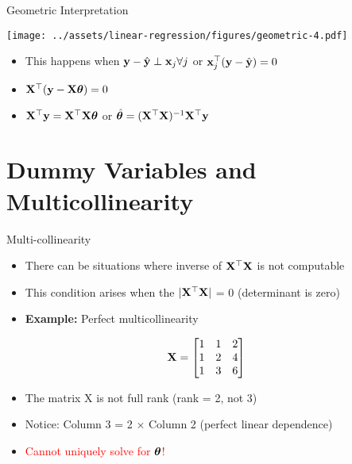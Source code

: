 \documentclass{beamer}
\begin{document}
\begin{frame}{Geometric Interpretation}	

    \texttt{[image: ../assets/linear-regression/figures/geometric-4.pdf]}

    


\begin{itemize}[<+->]
\item This happens when $\mathbf{y}-\hat{\mathbf{y}}\perp \mathbf{x}_j \forall j$ or $\mathbf{x}_j^\top(\mathbf{y}-\hat{\mathbf{y}})=0$
\item $\mathbf{X}^\top(\mathbf{y}-\mathbf{X}\boldsymbol{\theta})=0$
\item $\mathbf{X}^\top\mathbf{y} = \mathbf{X}^\top\mathbf{X}\boldsymbol{\theta}$ or $\hat{\boldsymbol{\theta}} =(\mathbf{X}^\top\mathbf{X})^{-1}\mathbf{X}^\top\mathbf{y}$ 
\end{itemize}

\end{frame}




\section{Dummy Variables and Multicollinearity}
\begin{frame}{Multi-collinearity}
\begin{itemize}[<+->]
    \item There can be situations where inverse of $\mathbf{X}^\top\mathbf{X}$ is not computable
    \item This condition arises when the $|\mathbf{X}^\top\mathbf{X}|$ = 0 (determinant is zero)
    \item \textbf{Example:} Perfect multicollinearity
\end{itemize}
    
    \begin{equation}
    \mathbf{X} = \begin{bmatrix}
    1 & 1& 2\\
    1 & 2& 4\\
    1 & 3& 6\\
    \end{bmatrix}
    \end{equation}
    
    \begin{itemize}[<+->]
        \item The matrix X is not full rank (rank = 2, not 3)
        \item Notice: Column 3 = 2 × Column 2 (perfect linear dependence)
        \item \textcolor{red}{Cannot uniquely solve for $\boldsymbol{\theta}$!}
    \end{itemize} 
    \end{frame}
    
\end{document}
